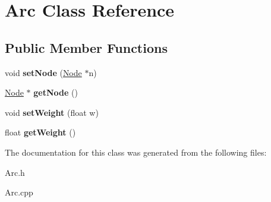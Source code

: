 \hypertarget{class_arc}{}\section{Arc Class Reference}
\label{class_arc}
\subsection*{Public Member Functions}
\begin{DoxyCompactItemize}
\item 
\mbox{\label{class_arc_afe60276bd76872e03a6cabf5f7af6474}} 
void {\bfseries set\+Node} (\mbox{\hyperlink{class_node}{Node}} $\ast$n)
\item 
\mbox{\label{class_arc_a26c9cc309b27a33a64cb3da129aa548c}} 
\mbox{\hyperlink{class_node}{Node}} $\ast$ {\bfseries get\+Node} ()
\item 
\mbox{\label{class_arc_a9339b212a1c053b0fec4a56326104b82}} 
void {\bfseries set\+Weight} (float w)
\item 
\mbox{\label{class_arc_a2b914759c552c7a732c2fdabe1dd3393}} 
float {\bfseries get\+Weight} ()
\end{DoxyCompactItemize}


The documentation for this class was generated from the following files\+:\begin{DoxyCompactItemize}
\item 
Arc.\+h\item 
Arc.\+cpp\end{DoxyCompactItemize}

